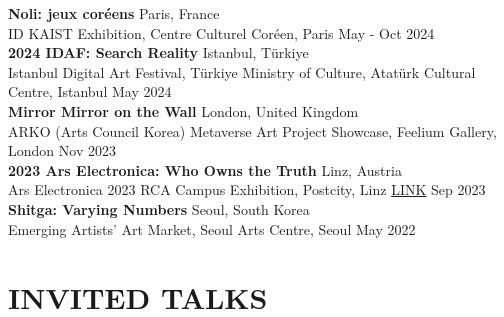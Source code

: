 \documentclass[a4paper,9pt]{extarticle}
\begin{document}
\noindent
\textbf{Noli: jeux coréens} \hfill Paris, France\\ %
{ID KAIST Exhibition, Centre Culturel Coréen, Paris} \hfill May - Oct 2024 \\


\noindent
\textbf{2024 IDAF: Search Reality} \hfill Istanbul, Türkiye\\ %
{Istanbul Digital Art Festival, Türkiye Ministry of Culture, Atatürk Cultural Centre, Istanbul} \hfill May 2024 \\

\noindent
\textbf{Mirror Mirror on the Wall} \hfill London, United Kingdom\\ %
{ARKO (Arts Council Korea) Metaverse Art Project Showcase, Feelium Gallery, London} \hfill Nov 2023 \\

\noindent
\textbf{2023 Ars Electronica: Who Owns the Truth} \hfill Linz, Austria\\ %
{Ars Electronica 2023 RCA Campus Exhibition, Postcity, Linz} \hfill \href{https://ars.electronica.art/who-owns-the-truth/de/%E2%89%A0/}{LINK} Sep 2023 \\


\noindent
\textbf{Shitga: Varying Numbers} \hfill Seoul, South Korea\\ %
{Emerging Artists' Art Market, Seoul Arts Centre, Seoul} \hfill May 2022 \\









\section*{INVITED TALKS}
\label{INVITED TALKS}
\end{document}
